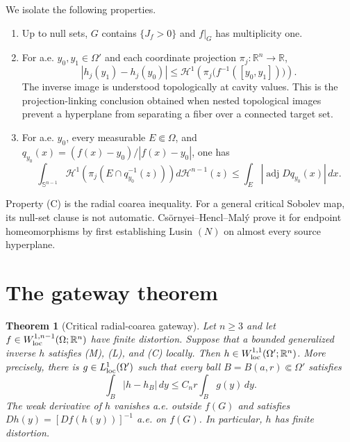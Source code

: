 \documentclass[11pt]{article}
\newtheorem{theorem}{Theorem}
\newcommand{\R}{\mathbb R}
\newcommand{\sphere}{\mathbb S^{n-1}}
\newcommand{\adj}{\operatorname{adj}}
\begin{document}
We isolate the following properties.

\begin{enumerate}
\item[(M)] Up to null sets, $G$ contains $\{J_f>0\}$ and $f|_G$ has
multiplicity one.
\item[(L)] For a.e. $y_0,y_1\in\Omega'$ and each coordinate projection
$\pi_j:\R^n\to\R$,
\[
 |h_j(y_1)-h_j(y_0)|
 \leq \mathcal H^1\!\left(
 \pi_j\bigl(f^{-1}([y_0,y_1])\bigr)\right).
\]
The inverse image is understood topologically at cavity values.  This is the
projection-linking conclusion obtained when nested topological images prevent
a hyperplane from separating a fiber over a connected target set.
\item[(C)] For a.e. $y_0$, every measurable $E\Subset\Omega$, and
$q_{y_0}(x)=(f(x)-y_0)/|f(x)-y_0|$, one has
\[
 \int_{\sphere}\mathcal H^1\!\left(
 \pi_j(E\cap q_{y_0}^{-1}(z))\right)d\mathcal H^{n-1}(z)
 \leq \int_E |\adj Dq_{y_0}(x)|\,dx .
\]
\end{enumerate}

Property (C) is the radial coarea inequality.  For a general critical Sobolev
map, its null-set clause is not automatic.  Cs\"ornyei--Hencl--Mal\'y prove it
for endpoint homeomorphisms by first establishing Lusin $(N)$ on almost every
source hyperplane.

\section{The gateway theorem}

\begin{theorem}[Critical radial-coarea gateway]\label{thm:gateway}
Let $n\ge3$ and let $f\in W^{1,n-1}_{\rm loc}(\Omega;\R^n)$ have finite
distortion.  Suppose that a bounded generalized inverse $h$ satisfies
\textup{(M)}, \textup{(L)}, and \textup{(C)} locally.  Then
$h\in W^{1,1}_{\rm loc}(\Omega';\R^n)$.  More precisely, there is
$g\in L^1_{\rm loc}(\Omega')$ such that every ball
$B=B(a,r)\Subset\Omega'$ satisfies
\begin{equation}\label{eq:poincare}
 \int_B |h-h_B|\,dy\leq C_n r\int_B g(y)\,dy.
\end{equation}
The weak derivative of $h$ vanishes a.e. outside $f(G)$ and satisfies
$Dh(y)=[Df(h(y))]^{-1}$ a.e. on $f(G)$.  In particular, $h$ has finite
distortion.
\end{theorem}
\end{document}
